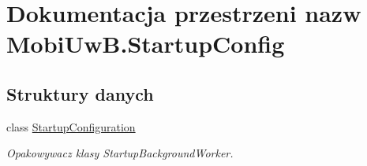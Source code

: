 \hypertarget{a00272}{}\section{Dokumentacja przestrzeni nazw Mobi\+Uw\+B.\+Startup\+Config}
\label{a00272}
\subsection*{Struktury danych}
\begin{DoxyCompactItemize}
\item 
class \hyperlink{a00061}{Startup\+Configuration}
\begin{DoxyCompactList}\small\item\em Opakowywacz klasy Startup\+Background\+Worker. \end{DoxyCompactList}\end{DoxyCompactItemize}
